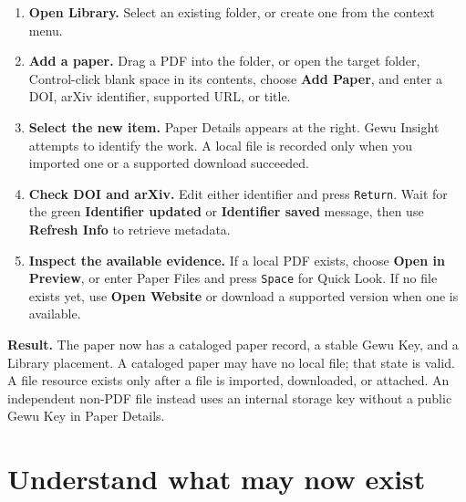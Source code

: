 \documentclass[10pt,letterpaper,oneside]{scrreprt}
\providecommand{\tightlist}{\setlength{\itemsep}{1pt}\setlength{\parskip}{0pt}}
\newenvironment{GewuResult}
  {\begin{tcolorbox}[enhanced,breakable,colback=GewuPale,colframe=GewuPale,boxrule=0pt,
    borderline west={1.6pt}{0pt}{GewuBlue},arc=1.2mm,left=2.5mm,right=2.5mm,top=1.7mm,bottom=1.7mm,
    before skip=4pt,after skip=5pt,fontupper=\color{GewuInk}\small\sffamily]}
  {\end{tcolorbox}}
\begin{document}
\begin{enumerate}
\tightlist
\item
  \textbf{Open \textbf{Library}.} Select an existing folder, or create one from the context menu.
\item
  \textbf{Add a paper.} Drag a PDF into the folder, or open the target folder, Control-click blank space in its contents, choose \textbf{Add Paper}, and enter a DOI, arXiv identifier, supported URL, or title.
\item
  \textbf{Select the new item.} Paper Details appears at the right. Gewu Insight attempts to identify the work. A local file is recorded only when you imported one or a supported download succeeded.
\item
  \textbf{Check \textbf{DOI} and \textbf{arXiv}.} Edit either identifier and press \texttt{Return}. Wait for the green \textbf{Identifier updated} or \textbf{Identifier saved} message, then use \textbf{Refresh Info} to retrieve metadata.
\item
  \textbf{Inspect the available evidence.} If a local PDF exists, choose \textbf{Open in Preview}, or enter Paper Files and press \texttt{Space} for Quick Look. If no file exists yet, use \textbf{Open Website} or download a supported version when one is available.
\end{enumerate}

\begin{GewuResult}
\textbf{Result.} The paper now has a cataloged paper record, a stable Gewu Key, and a Library placement. A cataloged paper may have no local file; that state is valid. A file resource exists only after a file is imported, downloaded, or attached. An independent non-PDF file instead uses an internal storage key without a public Gewu Key in Paper Details.
\end{GewuResult}

\section{Understand what may now exist}\label{understand-what-may-now-exist}
\end{document}
